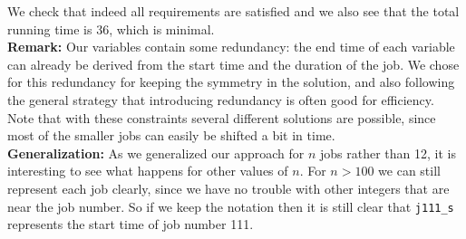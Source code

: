 \documentclass[a4paper]{article}
\begin{document}
We check that indeed all requirements are satisfied and we also see that the total running time is 36, which is minimal.\\

{\bf Remark:}
Our variables contain some redundancy: the end time of each variable can already be derived from the start time and the duration of the job. We chose for this redundancy for keeping the symmetry in the solution, and also following the general strategy that introducing redundancy is often good for efficiency.\\

Note that with these constraints several different solutions are possible, since most of the smaller jobs can easily be shifted a bit in time.\\

{\bf Generalization:} 
As we generalized our approach for $n$ jobs rather than 12, it is interesting to see what happens for other values of $n$. For $n > 100$ we can still represent each job clearly, since we have no trouble with other integers that are near the job number. So if we keep the notation then it is still clear that {\tt j111\_s} represents the start time of job number 111.
\end{document}
